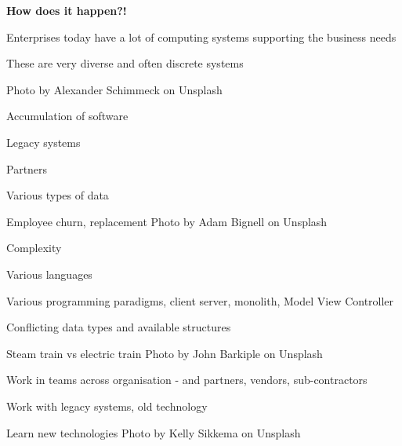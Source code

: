 \documentclass[Screen16to9,17pt]{foils}
\begin{document}

\textbf{How does it happen?!}


\begin{list2}
\item Enterprises today have a lot of computing systems supporting the business needs
\item These are very diverse and often discrete systems
\end{list2}

\hfill Photo by Alexander Schimmeck on Unsplash



\begin{list2}
\item Accumulation of software
\item Legacy systems
\item Partners
\item Various types of data
\item Employee churn, replacement \hfill Photo by Adam Bignell on Unsplash
\end{list2}




\begin{list2}
\item Complexity
\item Various languages
\item Various programming paradigms, client server, monolith, Model View Controller
\item Conflicting data types and available structures
\item Steam train vs electric train \hfill Photo by John Barkiple on Unsplash

\end{list2}






\begin{list2}
\item Work in teams across organisation - and partners, vendors, sub-contractors
\item Work with legacy systems, old technology
\item Learn new technologies \hfill Photo by Kelly Sikkema on Unsplash
\end{list2}
\end{document}
